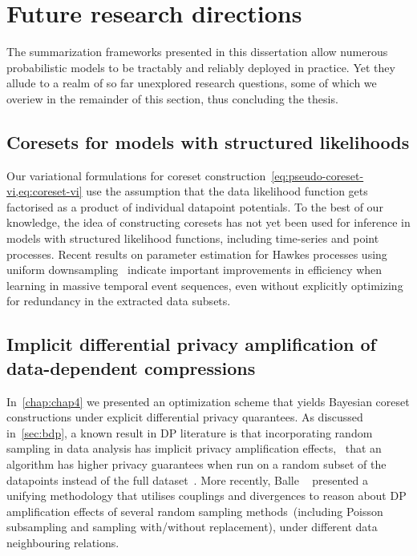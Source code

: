 \section{Future research directions}
\label{sec:future-research-directions}
The summarization frameworks presented in this dissertation allow numerous probabilistic models to be tractably and reliably deployed in practice. Yet they allude to a realm of so far unexplored research questions, some of which we overiew in the remainder of this section, thus concluding the thesis.

\subsection{Coresets for models with structured likelihoods}
\label{subsec:structure-liks}

Our variational formulations for coreset construction~\cref{eq:pseudo-coreset-vi,eq:coreset-vi} use the assumption that the data likelihood function gets factorised as a product of individual datapoint potentials. To the best of our knowledge, the idea of constructing coresets has not yet been used for inference in models with structured likelihood functions, including time-series and point processes. Recent results on parameter estimation for Hawkes processes using uniform downsampling~\citep{li19} indicate important improvements in efficiency when learning in massive temporal event sequences, even without explicitly optimizing for redundancy in the extracted data subsets.

\subsection{Implicit differential privacy amplification of data-dependent compressions}
\label{subsec:implicit-dp-amplification}

In~\cref{chap:chap4} we presented an optimization scheme that yields Bayesian coreset constructions under explicit differential privacy quarantees. As discussed in~\cref{sec:bdp}, a known result in DP literature is that incorporating random sampling in data analysis has implicit privacy amplification effects, \ie~that an algorithm has higher privacy guarantees when run on a random subset of the datapoints instead of the full dataset~\citep{li12, beimel13, bassily14, abadi16}. More recently, Balle \etal~\citep{balle18} presented a unifying methodology that utilises couplings and divergences to reason about DP amplification effects of several random sampling methods~(including Poisson subsampling and sampling with/without replacement), under different data neighbouring relations.

